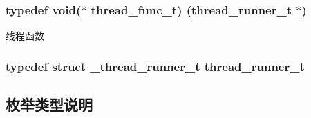 \subsubsection[{thread\+\_\+func\+\_\+t}]{\setlength{\rightskip}{0pt plus 5cm}typedef void($\ast$ thread\+\_\+func\+\_\+t) ({\bf thread\+\_\+runner\+\_\+t} $\ast$)}\label{a00047_a46bcd8005e5d86fdbc6be5af0a77156c_a46bcd8005e5d86fdbc6be5af0a77156c}
线程函数 \hypertarget{a00047_a9054159cde2f926ef61c28ce1e555199_a9054159cde2f926ef61c28ce1e555199}{}
\subsubsection[{thread\+\_\+runner\+\_\+t}]{\setlength{\rightskip}{0pt plus 5cm}typedef struct {\bf \+\_\+thread\+\_\+runner\+\_\+t} {\bf thread\+\_\+runner\+\_\+t}}\label{a00047_a9054159cde2f926ef61c28ce1e555199_a9054159cde2f926ef61c28ce1e555199}


\subsection{枚举类型说明}
\hypertarget{a00047_a2217ac7363dbae279d056a361d122915_a2217ac7363dbae279d056a361d122915}{}
